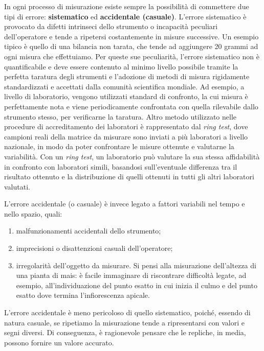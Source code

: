 \documentclass[a4paper,12pt,oneside]{book}
\providecommand{\tightlist}{%
  \setlength{\itemsep}{0pt}\setlength{\parskip}{0pt}}
\begin{document}
In ogni processo di misurazione esiste sempre la possibilità di commettere due tipi di errore: \textbf{sistematico} ed \textbf{accidentale (casuale)}. L'errore sistematico è provocato da difetti intrinseci dello strumento o incapacità peculiari dell'operatore e tende a ripetersi costantemente in misure successive. Un esempio tipico è quello di una bilancia non tarata, che tende ad aggiungere 20 grammi ad ogni misura che effettuiamo. Per queste sue peculiarità, l'errore sistematico non è quantificabile e deve essere contenuto al minimo livello possibile tramite la perfetta taratura degli strumenti e l'adozione di metodi di misura rigidamente standardizzati e accettati dalla comunità scientifica mondiale. Ad esempio, a livello di laboratorio, vengono utilizzati standard di confronto, la cui misura è perfettamente nota e viene periodicamente confrontata con quella rilevabile dallo strumento stesso, per verificarne la taratura. Altro metodo utilizzato nelle procedure di accreditamento dei laboratori è rappresentato dal \emph{ring test}, dove campioni reali della matrice da misurare sono inviati a più laboratori a livello nazionale, in modo da poter confrontare le misure ottenute e valutarne la variabilità. Con un \emph{ring test}, un laboratorio può valutare la sua stessa affidabilità in confronto con laboratori simili, basandosi sull'eventuale differenza tra il risultato ottenuto e la distribuzione di quelli ottenuti in tutti gli altri laboratori valutati.

L'errore accidentale (o casuale) è invece legato a fattori variabili nel tempo e nello spazio, quali:

\begin{enumerate}
\def\labelenumi{\arabic{enumi}.}
\tightlist
\item
  malfunzionamenti accidentali dello strumento;
\item
  imprecisioni o disattenzioni casuali dell'operatore;
\item
  irregolarità dell'oggetto da misurare. Si pensi alla misurazione dell'altezza di una pianta di mais: è facile immaginare di riscontrare difficoltà legate, ad esempio, all'individuazione del punto esatto in cui inizia il culmo e del punto esatto dove termina l'infiorescenza apicale.
\end{enumerate}

L'errore accidentale è meno pericoloso di quello sistematico, poiché, essendo di natura casuale, se ripetiamo la misurazione tende a ripresentarsi con valori e segni diversi. Di conseguenza, è ragionevole pensare che le repliche, in media, possono fornire un valore accurato.
\end{document}
